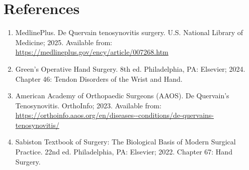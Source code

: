 \section*{References}
\begin{enumerate}
  \item MedlinePlus. De Quervain tenosynovitis surgery. U.S. National Library of Medicine; 2025. Available from: \url{https://medlineplus.gov/ency/article/007268.htm}
  \item Green's Operative Hand Surgery. 8th ed. Philadelphia, PA: Elsevier; 2024. Chapter 46: Tendon Disorders of the Wrist and Hand.
  \item American Academy of Orthopaedic Surgeons (AAOS). De Quervain's Tenosynovitis. OrthoInfo; 2023. Available from: \url{https://orthoinfo.aaos.org/en/diseases--conditions/de-quervains-tenosynovitis/}
  \item Sabiston Textbook of Surgery: The Biological Basis of Modern Surgical Practice. 22nd ed. Philadelphia, PA: Elsevier; 2022. Chapter 67: Hand Surgery.
\end{enumerate}

\clearpage
